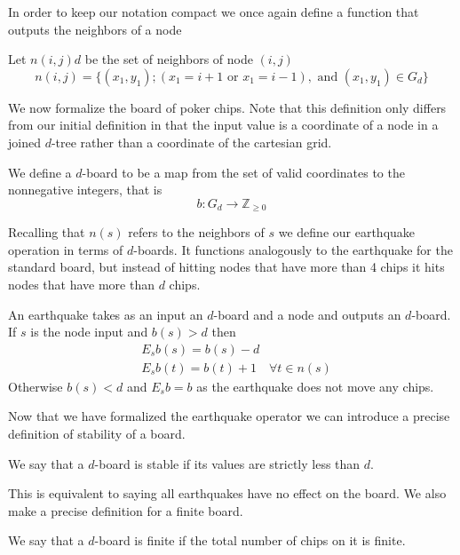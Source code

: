\documentclass[runningheads,a4paper]{llncs}
\begin{document}
In order to keep our notation compact we once again define a function that outputs the neighbors of a node
\begin{definition} 
Let $n(i,j)d$ be the set of neighbors of node $(i,j)$ 
\begin{equation*}
n(i,j) = \{ (x_1, y_1); (x_1 = i+1 \text{ or } x_1=i-1), \text{ and }(x_1, y_1) \in G_d\}
\end{equation*}
\end{definition}

We now formalize the board of poker chips. Note that this definition only differs from our initial definition in that the input value is a coordinate of a node in a joined $d$-tree rather than a coordinate of the cartesian grid.
\begin{definition}
We define a $d$-board to be a map from the set of valid coordinates to the nonnegative integers, that is 
\begin{equation}
b:  G_d \rightarrow \mathbb{Z}_{\geq 0}
\end{equation}
\end{definition}

Recalling that $n(s)$ refers to the neighbors of $s$ we define our earthquake operation in terms of $d$-boards. It functions analogously to the earthquake for the standard board, but instead of hitting nodes that have more than 4 chips it hits nodes that have more than $d$ chips. 
\begin{definition}
An earthquake takes as an input an $d$-board and a node and outputs an $d$-board. If $s$ is the node input and $b(s)>d$ then 
\begin{align*}
&E_s b(s) = b(s)- d \\
&E_s b(t) = b(t) +1 \quad \forall t \in n(s)
\end{align*}
Otherwise $b(s)<d$ and $E_s b=b$ as the earthquake does not move any chips.
\end{definition}

Now that we have formalized the earthquake operator we can introduce a precise definition of stability of a board. 
\begin{definition}
We say that a $d$-board is stable if its values are strictly less than $d$.
\end{definition}
This is equivalent to saying all earthquakes have no effect on the board. We also make a precise definition for a finite board.
\begin{definition} 
We say that a $d$-board is finite if the total number of chips on it is finite.
\end{definition}
\end{document}
